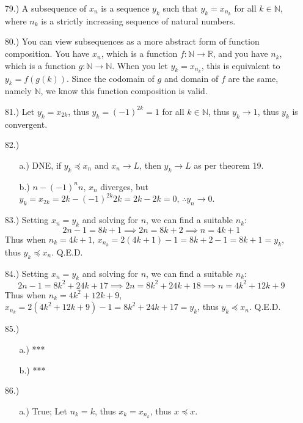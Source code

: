 \documentclass[12pt]{article}
\begin{document}
\begin{itemize}
    \item [79.)] A subsequence of $x_n$ is a sequence $y_k$ such that $y_k=x_{n_k}$ for all $k\in\mathbb{N}$, where $n_k$ is a strictly increasing sequence of natural numbers.

    \item [80.)] You can view subsequences as a more abstract form of function composition. You have $x_n$, which is a function $f:\mathbb{N}\to\mathbb{R}$, and you have $n_k$, which is a function $g:\mathbb{N}\to\mathbb{N}$. When you let $y_k=x_{n_k}$, this is equivalent to $y_k=f(g(k))$. Since the codomain of $g$ and domain of $f$ are the same, namely $\mathbb{N}$, we know this function composition is valid.

    \item [81.)] Let $y_k=x_{2k}$, thus $y_k=(-1)^{2k}=1$ for all $k\in\mathbb{N}$, thus $y_k\to1$, thus $y_k$ is convergent.

    \item [82.)] \begin{itemize}
        \item [a.)] DNE, if $y_k\preceq x_n$ and $x_n\to L$, then $y_k\to L$ as per theorem 19.

        \item [b.)] $n-(-1)^nn$, $x_n$ diverges, but $y_k=x_{2k}=2k-(-1)^{2k}2k=2k-2k=0,\,\therefore y_n\to0$.

    \end{itemize}

    \item [83.)] Setting $x_n=y_k$ and solving for $n$, we can find a suitable $n_k$:
    \[2n-1=8k+1\implies2n=8k+2\implies n=4k+1\]
    Thus when $n_k=4k+1$, $x_{n_k}=2(4k+1)-1=8k+2-1=8k+1=y_k$, thus $y_k\preceq x_n$. Q.E.D.

    \item [84.)] Setting $x_n=y_k$ and solving for $n$, we can find a suitable $n_k$:
    \[2n-1=8k^2+24k+17\implies2n=8k^2+24k+18\implies n=4k^2+12k+9\]
    Thus when $n_k=4k^2+12k+9$, $x_{n_k}=2(4k^2+12k+9)-1=8k^2+24k+17=y_k$, thus $y_k\preceq x_n$. Q.E.D.

    \item [85.)] \begin{itemize}
        \item [a.)] ***

        \item [b.)] ***
    \end{itemize}

    \item [86.)] \begin{itemize}
        \item [a.)] True; Let $n_k=k$, thus $x_k=x_{n_k}$, thus $x\preceq x$.


\end{itemize}
\end{itemize}
\end{document}
